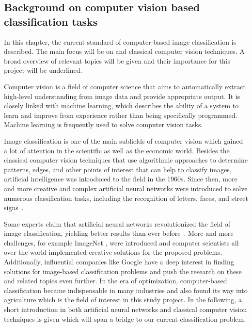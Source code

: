 \subsection{Background on computer vision based classification tasks}
\label{sec:BackgroundCV}

In this chapter, the current standard of computer-based image classification is described. The main focus will be on  and classical computer vision techniques. A broad overview of relevant topics will be given and their importance for this project will be underlined.

Computer vision is a field of computer science that aims to automatically extract high-level understanding from image data and provide appropriate output. It is closely linked with machine learning, which describes the ability of a system to learn and improve from experience rather than being specifically programmed. Machine learning is frequently used to solve computer vision tasks.

\bigskip
Image classification is one of the main subfields of computer vision which gained a lot of attention in the scientific as well as the economic world. Besides the classical computer vision techniques that use algorithmic approaches to determine patterns, edges, and other points of interest that can help to classify images, artificial intelligence was introduced to the field in the 1960s. Since then, more and more creative and complex artificial neural networks were introduced to solve numerous classification tasks, including the recognition of letters, faces, and street signs~\citep{mironczuk2018recent,balaban2015deep,stallkamp2011german}.

Some experts claim that artificial neural networks revolutionized the field of image classification, yielding better results than ever before~\citep{he2016deep,alexnet2012original}. More and more challenges, for example ImageNet \citep{russakovsky2015imagenet}, were introduced and computer scientists all over the world implemented creative solutions for the proposed problems. Additionally, influential companies like Google have a deep interest in finding solutions for image-based classification problems and push the research on these and related topics even further. In the era of optimization, computer-based classification became indispensable in many industries and also found its way into agriculture which is the field of interest in this study project.
In the following, a short introduction in both artificial neural networks and classical computer vision techniques is given which will span a bridge to our current classification problem.

